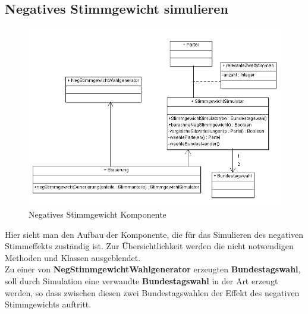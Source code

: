 \documentclass[12pt,a4paper,titlepage]{article}
\newcommand{\myma}{\fontfamily{pcr}\selectfont \textbf}
\begin{document}
\subsection{Negatives Stimmgewicht simulieren}
\begin{figure}[!ht]
\centering
\includegraphics[scale=0.9]{Klassendiagramme/StimmgewichtSimulator.png} \caption{Negatives Stimmgewicht Komponente} 
\end{figure}
Hier sieht man den Aufbau der Komponente, die für das Simulieren des negativen Stimmeffekts zuständig ist. Zur Übersichtlichkeit werden die nicht notwendigen Methoden und Klassen ausgeblendet. \\
Zu einer von {\myma{NegStimmgewichtWahlgenerator}} erzeugten {\myma{Bundestagswahl}}, soll durch Simulation eine verwandte {\myma{Bundestagswahl}} in der Art erzeugt werden, so dass zwischen diesen zwei Bundestagswahlen der Effekt des negativen Stimmgewichts auftritt. 
\end{document}
